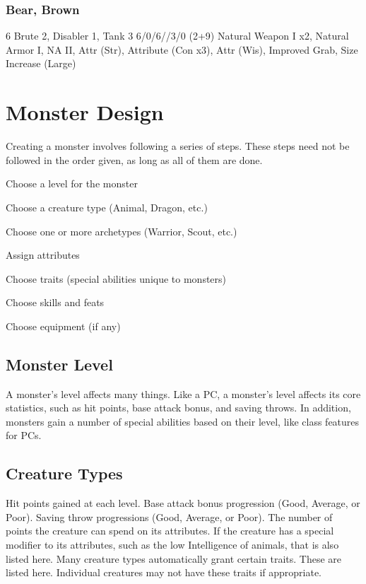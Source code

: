 \subsubsection{Bear, Brown}
 6
 Brute 2, Disabler 1, Tank 3
 6/0/6//3/0
 (2+9) Natural Weapon I x2, Natural Armor I, NA II, Attr (Str), Attribute (Con x3), Attr (Wis), Improved Grab, Size Increase (Large)

\section{Monster Design}

Creating a monster involves following a series of steps. These steps need not be followed in the order given, as long as all of them are done.

\begin{enumerate*}
    \item Choose a level for the monster
    \item Choose a creature type (Animal, Dragon, etc.)
    \item Choose one or more archetypes (Warrior, Scout, etc.)
    \item Assign attributes
    \item Choose traits (special abilities unique to monsters)
    \item Choose skills and feats
    \item Choose equipment (if any)
\end{enumerate*}

\subsection{Monster Level}
A monster's level affects many things. Like a PC, a monster's level affects its core statistics, such as hit points, base attack bonus, and saving throws. In addition, monsters gain a number of special abilities based on their level, like class features for PCs.

\subsection{Creature Types}
 Hit points gained at each level.
 Base attack bonus progression (Good, Average, or Poor).
 Saving throw progressions (Good, Average, or Poor).
 The number of points the creature can spend on its attributes. If the creature has a special modifier to its attributes, such as the low Intelligence of animals, that is also listed here.
 Many creature types automatically grant certain traits. These are listed here. Individual creatures may not have these traits if appropriate.

